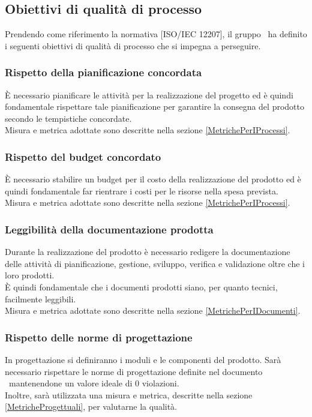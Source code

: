 \documentclass[../PianoDiQualifica.tex]{subfiles}
\begin{document}
		\subsection{Obiettivi di qualità di processo}
			Prendendo come riferimento la normativa [ISO/IEC 12207], il gruppo \kaleidoscode\ ha
			definito i seguenti obiettivi di qualità di processo che si impegna a perseguire.
			\subsubsection{Rispetto della pianificazione concordata}
				È necessario pianificare le attività per la realizzazione del progetto ed è
				quindi fondamentale rispettare tale pianificazione per garantire la consegna
				del prodotto secondo le tempistiche concordate.\\
				Misura e metrica adottate sono descritte nella sezione \ref{MetrichePerIProcessi}.
			\subsubsection{Rispetto del budget concordato}
				È necessario stabilire un budget per il costo della realizzazione del prodotto ed è
				quindi fondamentale far rientrare i costi per le risorse nella spesa prevista.\\
				Misura e metrica adottate sono descritte nella sezione \ref{MetrichePerIProcessi}.
			\subsubsection{Leggibilità della documentazione prodotta}
				Durante la realizzazione del prodotto è necessario redigere la documentazione
				delle attività di pianificazione, gestione, sviluppo, verifica e validazione oltre
				che i loro prodotti.\\
				È quindi fondamentale che i documenti prodotti siano, per quanto tecnici,
				facilmente leggibili.\\
				Misura e metrica adottate sono descritte nella sezione \ref{MetrichePerIDocumenti}.
			\subsubsection{Rispetto delle norme di progettazione}
				In progettazione si definiranno i moduli e le componenti del prodotto. Sarà necessario
				rispettare le norme di progettazione definite nel documento \normediprogetto\
				mantenendone un valore ideale di $0$ violazioni.\\
				Inoltre, sarà utilizzata una misura e metrica, descritte nella sezione
				\ref{MetricheProgettuali}, per valutarne la qualità.
\end{document}
